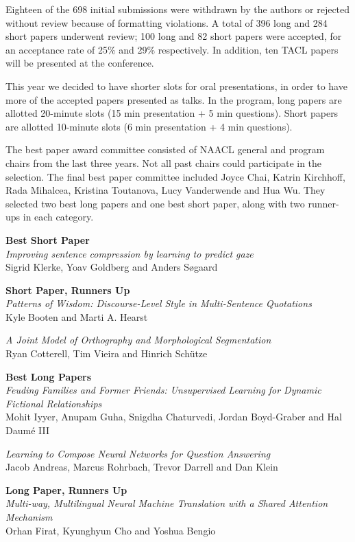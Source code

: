 Eighteen of the 698 initial submissions were withdrawn by the authors or 
rejected without review because of formatting violations. A total of 396 
long and 284 short papers underwent review; 100 long and 82 short papers 
were accepted, for an acceptance rate of 25\% and 29\% respectively. In 
addition, ten TACL papers will be presented at the conference.

This year we decided to have shorter slots for oral presentations, in order 
to have more of the accepted papers presented as talks. In the program, 
long papers are allotted 20-minute slots (15 min presentation + 5 min 
questions). Short papers are allotted 10-minute slots (6 min presentation + 
4 min questions).

The best paper award committee consisted of NAACL general and program 
chairs from the last three years. Not all past chairs could participate in 
the selection. The final best paper committee included Joyce Chai, Katrin 
Kirchhoff, Rada Mihalcea, Kristina Toutanova, Lucy Vanderwende and Hua Wu. 
They selected two best long papers and one best short paper, along with two 
runner-ups in each category.

\noindent \textbf{Best Short Paper}\\
\emph{Improving sentence compression by learning to predict gaze}\\
Sigrid Klerke, Yoav Goldberg and Anders S{\o}gaard

\noindent \textbf{Short Paper, Runners Up}\\
\emph{Patterns of Wisdom: Discourse-Level Style in Multi-Sentence Quotations}\\
Kyle Booten and Marti A. Hearst

\noindent \emph{A Joint Model of Orthography and Morphological Segmentation}\\
Ryan Cotterell, Tim Vieira and Hinrich Schütze

\noindent \textbf{Best Long Papers}\\
\emph{Feuding Families and Former Friends: Unsupervised Learning for Dynamic Fictional Relationships}\\
Mohit Iyyer, Anupam Guha, Snigdha Chaturvedi, Jordan Boyd-Graber and Hal Daum\'{e} III

\noindent \emph{Learning to Compose Neural Networks for Question Answering}\\
Jacob Andreas, Marcus Rohrbach, Trevor Darrell and Dan Klein

\noindent \textbf{Long Paper, Runners Up}\\
\emph{Multi-way, Multilingual Neural Machine Translation with a Shared Attention Mechanism}\\
Orhan Firat, Kyunghyun Cho and Yoshua Bengio

